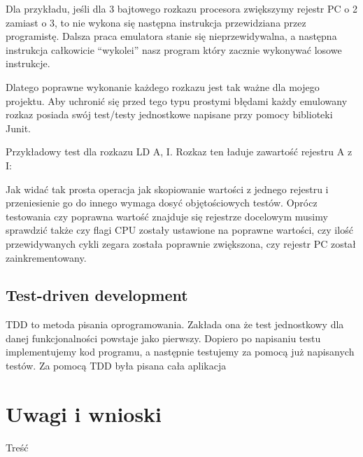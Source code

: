 \documentclass{article}
\begin{document}
	Dla przykładu, jeśli dla 3 bajtowego rozkazu procesora zwiększymy rejestr PC o 2 zamiast o 3, to nie wykona się następna instrukcja przewidziana przez programistę. Dalsza praca emulatora stanie się nieprzewidywalna, a następna instrukcja całkowicie “wykolei” nasz program który zacznie wykonywać losowe instrukcje. 
	
	Dlatego poprawne wykonanie każdego rozkazu jest tak ważne dla mojego projektu. Aby uchronić się przed tego typu prostymi błędami każdy emulowany rozkaz posiada swój test/testy jednostkowe napisane przy pomocy biblioteki Junit. 
	
	Przykładowy test dla rozkazu LD A, I. Rozkaz ten ładuje zawartość rejestru A z I:
	
	
	Jak widać tak prosta operacja jak skopiowanie wartości z jednego rejestru i przeniesienie go do innego wymaga dosyć objętościowych testów. Oprócz testowania czy poprawna wartość znajduje się rejestrze docelowym musimy sprawdzić także czy flagi CPU zostały ustawione na poprawne wartości, czy ilość przewidywanych cykli zegara została poprawnie zwiększona, czy rejestr PC został zainkrementowany. 
	
	\subsection{Test-driven development}
	TDD to metoda pisania oprogramowania. Zakłada ona że test jednostkowy dla danej funkcjonalności powstaje jako pierwszy. Dopiero po napisaniu testu implementujemy kod programu, a następnie testujemy za pomocą już napisanych testów. Za pomocą TDD była pisana cała aplikacja
	
	\section{Uwagi i wnioski}
	Treść
	
\end{document}
